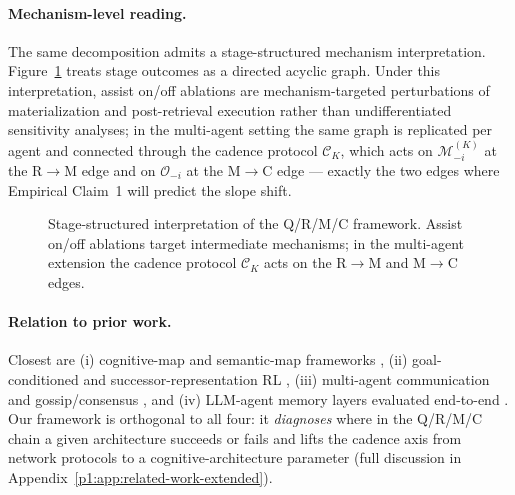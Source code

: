 \documentclass{article}
\begin{document}
\paragraph{Mechanism-level reading.}
The same decomposition admits a stage-structured mechanism
interpretation. Figure~\ref{p1:fig:causal} treats stage outcomes as a
directed acyclic graph. Under this interpretation, assist on/off
ablations are mechanism-targeted perturbations of materialization and
post-retrieval execution rather than undifferentiated sensitivity
analyses; in the multi-agent setting the same graph is replicated per
agent and connected through the cadence protocol $\mathcal{C}_K$,
which acts on $\mathcal{M}_{-i}^{(K)}$ at the R$\to$M edge and on
$\mathcal{O}_{-i}$ at the M$\to$C edge --- exactly the two edges where
Empirical Claim~1 will predict the slope shift.

\begin{figure}[t]
  \centering
  \caption{Stage-structured interpretation of the Q/R/M/C framework. Assist on/off ablations target intermediate mechanisms; in the multi-agent extension the cadence protocol $\mathcal{C}_K$ acts on the R$\to$M and M$\to$C edges.}
  \label{p1:fig:causal}
\end{figure}

\paragraph{Relation to prior work.} Closest are (i) cognitive-map and semantic-map frameworks \citep{tolman1948cognitive,okeefe1978hippocampus,kuipers2000spatial,gupta2017cognitive,savinov2018semi}, (ii) goal-conditioned and successor-representation RL \citep{andrychowicz2017hindsight,ghosh2021learning,dayan1993improving,stachenfeld2017hippocampus,momennejad2017successor}, (iii) multi-agent communication \citep{lowe2017maddpg,foerster2018ctde,sukhbaatar2016commnet,foerster2016learning} and gossip/consensus \citep{boyd2006gossip,xiao2007distributed}, and (iv) LLM-agent memory layers evaluated end-to-end \citep{wang2023voyager,shinn2023reflexion,packer2023memgpt}. Our framework is orthogonal to all four: it \emph{diagnoses} where in the Q/R/M/C chain a given architecture succeeds or fails and lifts the cadence axis from network protocols to a cognitive-architecture parameter (full discussion in Appendix~\ref{p1:app:related-work-extended}).
\end{document}
